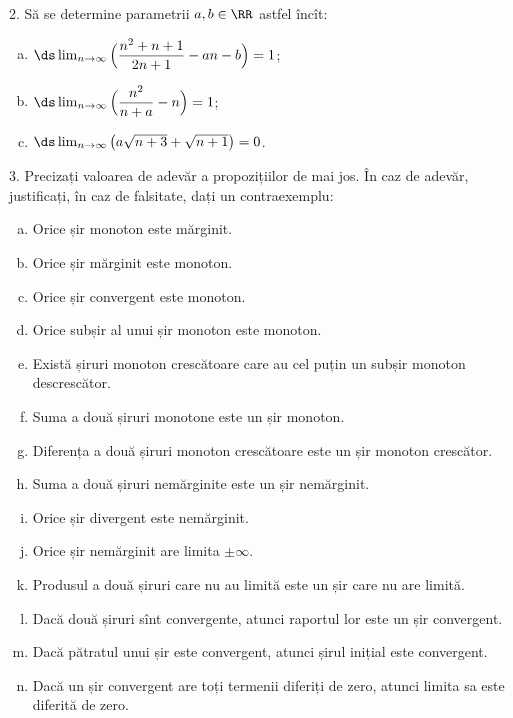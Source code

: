 \vspace{1cm}

2. Să se determine parametrii $ a, b \in \RR $ astfel încît:
\begin{enumerate}[(a)]
\item $ \ds\lim_{n \to \infty} \Big( \dfrac{n^2 + n + 1}{2n + 1} - an - b \Big) = 1 $;
\item $ \ds\lim_{n \to \infty} \Big( \dfrac{n^2}{n + a} - n \Big) = 1 $;
\item $ \ds\lim_{n \to \infty}\big( a\sqrt{n + 3} + \sqrt{n + 1} \big) = 0 $.
\end{enumerate}

\vspace{1cm}

3. Precizați valoarea de adevăr a propozițiilor de mai jos. În caz de adevăr,
justificați, în caz de falsitate, dați un contraexemplu:
\begin{enumerate}[(a)]
\item Orice șir monoton este mărginit.
\item Orice șir mărginit este monoton.
\item Orice șir convergent este monoton.
\item Orice subșir al unui șir monoton este monoton.
\item Există șiruri monoton crescătoare care au cel puțin un subșir monoton descrescător.
\item Suma a două șiruri monotone este un șir monoton.
\item Diferența a două șiruri monoton crescătoare este un șir monoton crescător.
\item Suma a două șiruri nemărginite este un șir nemărginit.
\item Orice șir divergent este nemărginit.
\item Orice șir nemărginit are limita $ \pm \infty $.
\item Produsul a două șiruri care nu au limită este un șir care nu are limită.
\item Dacă două șiruri sînt convergente, atunci raportul lor este un șir convergent.
\item Dacă pătratul unui șir este convergent, atunci șirul inițial este convergent.
\item Dacă un șir convergent are toți termenii diferiți de zero, atunci limita sa
  este diferită de zero.
\end{enumerate}



